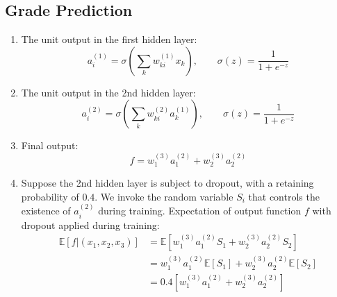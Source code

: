 \documentclass[a4paper, 10pt]{article}
\begin{document}
\subsection{Grade Prediction}
\begin{enumerate}[label=(\alph*)]
    \item The unit output in the first hidden layer:
    \begin{equation}
        a_i^{(1)} = \sigma\left(\sum_{k} w_{ki}^{(1)} x_k \right),\qquad \sigma(z) = \frac{1}{1 + e^{-z}}
    \end{equation}
    
    \item The unit output in the 2nd hidden layer:
    \begin{equation}
        a_i^{(2)} = \sigma\left(\sum_{k} w_{ki}^{(2)} a_k^{(1)} \right),\qquad \sigma(z) = \frac{1}{1 + e^{-z}}
    \end{equation}
    
    \item Final output:
    \begin{equation}
        f = w_1^{(3)} a_1^{(2)} + w_2^{(3)} a_2^{(2)}
    \end{equation}
    
    \item Suppose the 2nd hidden layer is subject to dropout, with a retaining probability of $0.4$. We invoke the random variable $S_i$ that controls the existence of $a_i^{(2)}$ during training. Expectation of output function $f$ with dropout applied during training:
    \begin{equation}
        \begin{aligned}
            \mathbb{E} \left[f | (x_1, x_2, x_3)\right] &= \mathbb{E} \left[ w_1^{(3)} a_1^{(2)} S_1 + w_2^{(3)} a_2^{(2)} S_2 \right] \\
            &= w_1^{(3)} a_1^{(2)} \mathbb{E}[S_1] + w_2^{(3)} a_2^{(2)} \mathbb{E}[S_2] \\
            &= 0.4 \left[ w_1^{(3)} a_1^{(2)} + w_2^{(3)} a_2^{(2)} \right]
        \end{aligned}
    \end{equation}
    

\end{enumerate}
\end{document}
